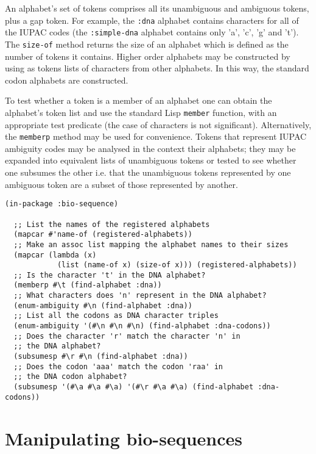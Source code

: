 \documentclass[a4paper, 12pt]{article}
\begin{document}
An alphabet's set of tokens comprises all its unambiguous and
ambiguous tokens, plus a gap token. For example, the \lstinline!:dna!
alphabet contains characters for all of the IUPAC codes (the
\lstinline!:simple-dna!  alphabet contains only 'a', 'c', 'g' and
't'). The \lstinline!size-of!  method returns the size of an alphabet
which is defined as the number of tokens it contains. Higher order
alphabets may be constructed by using as tokens lists of characters
from other alphabets. In this way, the standard codon alphabets are
constructed.

To test whether a token is a member of an alphabet one can obtain the
alphabet's token list and use the standard Lisp \lstinline!member!
function, with an appropriate test predicate (the case of characters
is not significant). Alternatively, the \lstinline!memberp! method may
be used for convenience. Tokens that represent IUPAC ambiguity codes
may be analysed in the context their alphabets; they may be expanded
into equivalent lists of unambiguous tokens or tested to see whether
one subsumes the other i.e. that the unambiguous tokens represented by
one ambiguous token are a subset of those represented by another.

\begin{lstlisting}[caption={Using bio-sequence alphabets},
  label=use-bioseq-alphabets]
  (in-package :bio-sequence)
  
  ;; List the names of the registered alphabets
  (mapcar #'name-of (registered-alphabets))
  ;; Make an assoc list mapping the alphabet names to their sizes
  (mapcar (lambda (x)
            (list (name-of x) (size-of x))) (registered-alphabets))
  ;; Is the character 't' in the DNA alphabet?
  (memberp #\t (find-alphabet :dna))
  ;; What characters does 'n' represent in the DNA alphabet?
  (enum-ambiguity #\n (find-alphabet :dna))
  ;; List all the codons as DNA character triples
  (enum-ambiguity '(#\n #\n #\n) (find-alphabet :dna-codons))
  ;; Does the character 'r' match the character 'n' in
  ;; the DNA alphabet?
  (subsumesp #\r #\n (find-alphabet :dna))
  ;; Does the codon 'aaa' match the codon 'raa' in
  ;; the DNA codon alphabet?
  (subsumesp '(#\a #\a #\a) '(#\r #\a #\a) (find-alphabet :dna-codons))
\end{lstlisting}


\section{Manipulating bio-sequences}
\label{sec:manip-bioseq}
\end{document}
